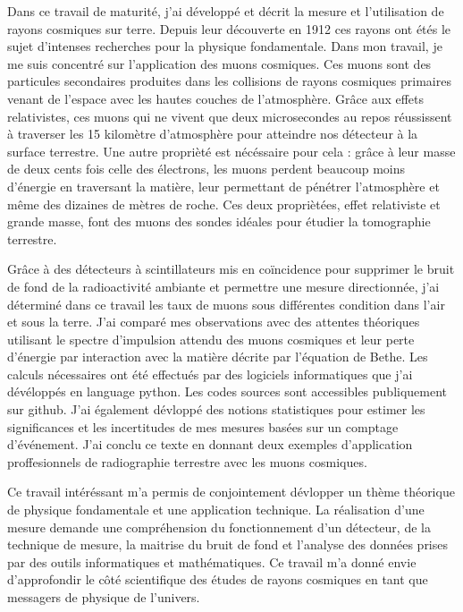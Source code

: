 \documentclass[a4paper, 12pt]{article}
\begin{document}
\begin{spacing}{1.5}
Dans ce travail de maturité, j'ai développé et décrit la mesure et l'utilisation de rayons cosmiques sur terre. Depuis leur découverte en 1912 ces rayons ont étés le sujet d'intenses recherches pour la physique fondamentale. Dans mon travail, je me suis concentré sur l'application des muons cosmiques. Ces muons sont des particules secondaires produites dans les collisions de rayons cosmiques primaires venant de l'espace avec les hautes couches de l'atmosphère. Grâce aux effets relativistes, ces muons qui ne vivent que deux microsecondes au repos réussissent à traverser les 15 kilomètre d'atmosphère pour atteindre nos détecteur à la surface terrestre. Une autre proprièté est nécéssaire pour cela : grâce à leur masse de deux cents fois celle des électrons, les muons perdent beaucoup moins d'énergie en traversant la matière, leur permettant de pénétrer l'atmosphère et même des dizaines de mètres de roche. Ces deux propriètées, effet relativiste et grande masse, font des muons des sondes idéales pour étudier la tomographie terrestre. 

Grâce à des détecteurs à scintillateurs mis en coïncidence pour supprimer le bruit de fond de la radioactivité ambiante et permettre une mesure directionnée, j'ai déterminé dans ce travail les taux de muons sous différentes condition dans l'air et sous la terre. J'ai comparé mes observations avec des attentes théoriques utilisant le spectre d'impulsion attendu des muons cosmiques et leur perte d'énergie par interaction avec la matière décrite par l'équation de Bethe. Les calculs nécessaires ont été effectués par des logiciels informatiques que j'ai dévéloppés en language python. Les codes sources sont accessibles publiquement sur github. J'ai également dévloppé des notions statistiques pour estimer les significances et les incertitudes de mes mesures basées sur un comptage d'événement. J'ai conclu ce texte en donnant deux exemples d'application proffesionnels de radiographie terrestre avec les muons cosmiques.

Ce travail intéréssant m'a permis de conjointement dévlopper un thème théorique de physique fondamentale et une application technique. La réalisation d'une mesure demande une compréhension du fonctionnement d'un détecteur, de la technique de mesure, la maitrise du bruit de fond et l'analyse des données prises par des outils informatiques et mathématiques. Ce travail m'a donné envie d'approfondir le côté scientifique des études de rayons cosmiques en tant que messagers de physique de l'univers.




\end{spacing}
\end{document}
